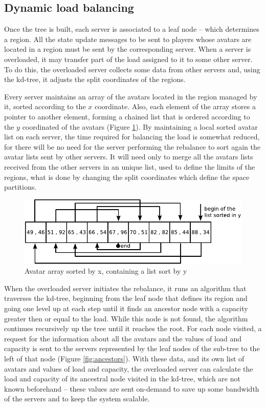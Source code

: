 \documentclass[acmtocl]{acmtrans2m}
\begin{document}
\subsection{Dynamic load balancing}

Once the tree is built, each server is associated to a leaf node -- which determines a region. All the state update messages to be sent to players whose avatars are located in a region must be sent by the corresponding server. When a server is overloaded, it may transfer part of the load assigned to it to some other server. To do this, the overloaded server collects some data from other servers and, using the kd-tree, it adjusts the split coordinates of the regions.

Every server maintains an array of the avatars located in the region managed by it, sorted according to the $x$ coordinate. Also, each element of the array stores a pointer to another element, forming a chained list that is ordered according to the $y$ coordinated of the avatars (Figure \ref{fig:vectorxlisty}). By maintaining a local sorted avatar list on each server, the time required for balancing the load is somewhat reduced, for there will be no need for the server performing the rebalance to sort again the avatar lists sent by other servers. It will need only to merge all the avatars lists received from the other servers in an unique list, used to define the limits of the regions, what is done by changing the split coordinates which define the space partitions.

\begin{figure}
  \centering
  \includegraphics[width=0.9\linewidth]{images/vectorxlisty}
  \caption{Avatar array sorted by x, containing a list sort by y}
   \label{fig:vectorxlisty}
\end{figure}

When the overloaded server initiates the rebalance, it runs an algorithm that traverses the kd-tree, beginning from the leaf node that defines its region and going one level up at each step until it finds an ancestor node with a capacity greater then or equal to the load. While this node is not found, the algorithm continues recursively up the tree until it reaches the root. For each node visited, a request for the information about all the avatars and the values of load and capacity is sent to the servers represented by the leaf nodes of the sub-tree to the left of that node (Figure \ref{fig:ancestors}). With these data, and its own list of avatars and values of load and capacity, the overloaded server can calculate the load and capacity of its ancestral node visited in the kd-tree, which are not known beforehand -- these values are sent on-demand to save up some bandwidth of the servers and to keep the system scalable.
\end{document}
